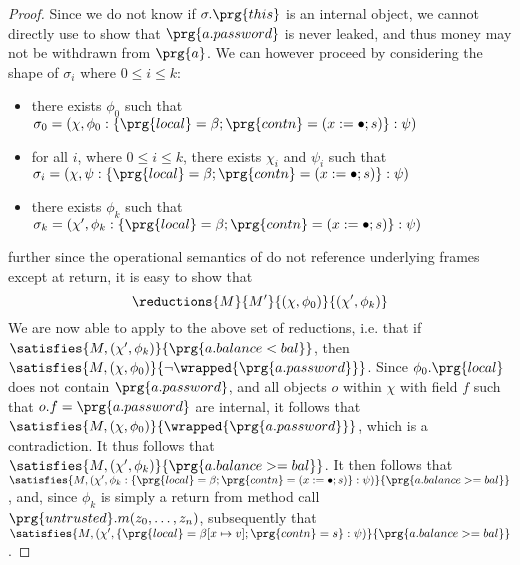 \begin{proof}
Since we do not know if $\sigma.\prg{this}$ is an internal object, we cannot directly use \SrobustB to show that $\prg{a.password}$ is never leaked, and thus 
money may not be withdrawn from $\prg{a}$. We can however proceed by considering the shape of $\sigma_i$ where $0 \leq i \leq k$:
\begin{itemize}
\item
there exists $\phi_0$ such that $\sigma_0 = (\chi, \phi_0 : \{\prg{local} = \beta; \prg{contn} = (x := \bullet; s)\} : \psi)$ 
\item
for all $i$, where $0 \leq i \leq k$, there exists $\chi_i$ and $\psi_i$ such that $\sigma_i = (\chi, \psi : \{\prg{local} = \beta; \prg{contn} = (x := \bullet; s)\} : \psi)$
\item
there exists $\phi_k$ such that $\sigma_k = (\chi', \phi_k : \{\prg{local} = \beta; \prg{contn} = (x := \bullet; s)\} : \psi)$
\end{itemize}
further since the operational semantics of \Loo do not reference underlying frames except at return, it is easy to show that 
$$\reductions{M}{M'}{(\chi, \phi_0)}{(\chi', \phi_k)}$$
We are now able to apply \SrobustB to the above set of reductions, i.e. that if $\satisfies{M, (\chi', \phi_k)}{\prg{a.balance < bal}}$,
then $\satisfies{M, (\chi, \phi_0)}{\neg \wrapped{\prg{a.password}}}$. 
Since $\phi_0.\prg{local}$ does not contain $\prg{a.password}$, and all objects $o$ within $\chi$ with field $f$ such that $o.f = \prg{a.password}$ 
are internal, it follows that $\satisfies{M, (\chi, \phi_0)}{\wrapped{\prg{a.password}}}$, which is a contradiction. It thus follows that
$\satisfies{M, (\chi', \phi_k)}{\prg{a.balance >= bal}}$. It then follows that $\satisfies{M, (\chi', \phi_k : \{\prg{local} = \beta; \prg{contn} = (x := \bullet; s)\} : \psi)}{\prg{a.balance >= bal}}$,
and, since $\phi_k$ is simply a return from method call $\prg{untrusted}.m(z_0, \ldots, z_n)$, subsequently that $\satisfies{M, (\chi', \{\prg{local} = \beta[x \mapsto v]; \prg{contn} = s\} : \psi)}{\prg{a.balance >= bal}}$.
\end{proof}





